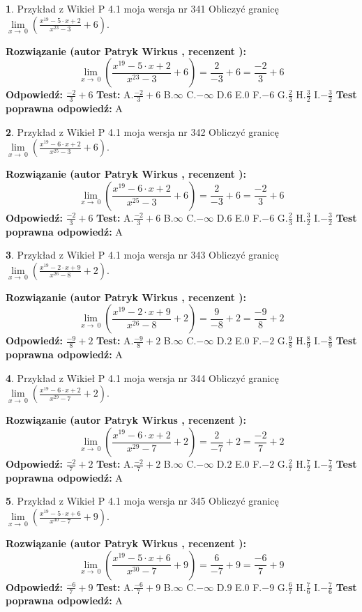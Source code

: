 \documentclass[12pt, a4paper]{article}
\theoremstyle{definition} %
\newtheorem{zad}{}
\newcommand{\zadStart}[1]{\begin{zad}#1\newline}
\newcommand{\zadStop}{\end{zad}}
\newcommand{\rozwStart}[2]{\noindent \textbf{Rozwiązanie (autor #1 , recenzent #2): }\newline}
\newcommand{\rozwStop}{\newline}
\newcommand{\odpStart}{\noindent \textbf{Odpowiedź:}\newline}
\newcommand{\odpStop}{\newline}
\newcommand{\testStart}{\noindent \textbf{Test:}\newline}
\newcommand{\testStop}{\newline}
\newcommand{\kluczStart}{\noindent \textbf{Test poprawna odpowiedź:}\newline}
\newcommand{\kluczStop}{\newline}
\begin{document}
\zadStart{Przykład z Wikieł P 4.1 moja wersja nr 341}
Obliczyć granicę $\lim\limits_{x\to\ 0}(\frac{x^{19}-5 \cdot x +2}{x^{23}-3}+6)$.
\zadStop
\rozwStart{Patryk Wirkus}{}
$$\lim\limits_{x\to\ 0}(\frac{x^{19}-5 \cdot x +2}{x^{23}-3}+6)=\frac{2}{-3}+6=\frac{-2}{3}+6$$
\rozwStop
\odpStart
$\frac{-2}{3}+6$
\odpStop
\testStart
A.$\frac{-2}{3}+6$
B.$\infty$
C.$-\infty$
D.$6$
E.$0$
F.$-6$
G.$\frac{2}{3}$
H.$\frac{3}{2}$
I.$-\frac{3}{2}$
\testStop
\kluczStart
A
\kluczStop



\zadStart{Przykład z Wikieł P 4.1 moja wersja nr 342}
Obliczyć granicę $\lim\limits_{x\to\ 0}(\frac{x^{19}-6 \cdot x +2}{x^{25}-3}+6)$.
\zadStop
\rozwStart{Patryk Wirkus}{}
$$\lim\limits_{x\to\ 0}(\frac{x^{19}-6 \cdot x +2}{x^{25}-3}+6)=\frac{2}{-3}+6=\frac{-2}{3}+6$$
\rozwStop
\odpStart
$\frac{-2}{3}+6$
\odpStop
\testStart
A.$\frac{-2}{3}+6$
B.$\infty$
C.$-\infty$
D.$6$
E.$0$
F.$-6$
G.$\frac{2}{3}$
H.$\frac{3}{2}$
I.$-\frac{3}{2}$
\testStop
\kluczStart
A
\kluczStop



\zadStart{Przykład z Wikieł P 4.1 moja wersja nr 343}
Obliczyć granicę $\lim\limits_{x\to\ 0}(\frac{x^{19}-2 \cdot x +9}{x^{26}-8}+2)$.
\zadStop
\rozwStart{Patryk Wirkus}{}
$$\lim\limits_{x\to\ 0}(\frac{x^{19}-2 \cdot x +9}{x^{26}-8}+2)=\frac{9}{-8}+2=\frac{-9}{8}+2$$
\rozwStop
\odpStart
$\frac{-9}{8}+2$
\odpStop
\testStart
A.$\frac{-9}{8}+2$
B.$\infty$
C.$-\infty$
D.$2$
E.$0$
F.$-2$
G.$\frac{9}{8}$
H.$\frac{8}{9}$
I.$-\frac{8}{9}$
\testStop
\kluczStart
A
\kluczStop



\zadStart{Przykład z Wikieł P 4.1 moja wersja nr 344}
Obliczyć granicę $\lim\limits_{x\to\ 0}(\frac{x^{19}-6 \cdot x +2}{x^{29}-7}+2)$.
\zadStop
\rozwStart{Patryk Wirkus}{}
$$\lim\limits_{x\to\ 0}(\frac{x^{19}-6 \cdot x +2}{x^{29}-7}+2)=\frac{2}{-7}+2=\frac{-2}{7}+2$$
\rozwStop
\odpStart
$\frac{-2}{7}+2$
\odpStop
\testStart
A.$\frac{-2}{7}+2$
B.$\infty$
C.$-\infty$
D.$2$
E.$0$
F.$-2$
G.$\frac{2}{7}$
H.$\frac{7}{2}$
I.$-\frac{7}{2}$
\testStop
\kluczStart
A
\kluczStop



\zadStart{Przykład z Wikieł P 4.1 moja wersja nr 345}
Obliczyć granicę $\lim\limits_{x\to\ 0}(\frac{x^{19}-5 \cdot x +6}{x^{30}-7}+9)$.
\zadStop
\rozwStart{Patryk Wirkus}{}
$$\lim\limits_{x\to\ 0}(\frac{x^{19}-5 \cdot x +6}{x^{30}-7}+9)=\frac{6}{-7}+9=\frac{-6}{7}+9$$
\rozwStop
\odpStart
$\frac{-6}{7}+9$
\odpStop
\testStart
A.$\frac{-6}{7}+9$
B.$\infty$
C.$-\infty$
D.$9$
E.$0$
F.$-9$
G.$\frac{6}{7}$
H.$\frac{7}{6}$
I.$-\frac{7}{6}$
\testStop
\kluczStart
A
\kluczStop
\end{document}
